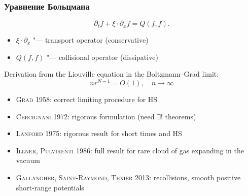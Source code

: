 \documentclass[mathserif]{beamer} %
\newcommand{\pder}[2][]{\partial_{#2}{#1}}
\newcommand{\OO}[1]{O(#1)}
\newcommand{\Cite}[2][]{\alert{\textsc{#2 #1}}}
\begin{document}
\begin{frame}
    \frametitle{Уравнение Больцмана}
    \begin{equation*}
        \pder[f]{t} + \xi\cdot\pder[f]{x} = Q(f,f).
    \end{equation*}

    \begin{itemize}
        \item \(\xi\cdot\pder{x}\) "--- transport operator (conservative)
        \item \(Q(f,f)\) "--- collisional operator (dissipative)
    \end{itemize}

    \pause
    Derivation from the Liouville equation in the Boltzmann--Grad limit: %
    \[ nr^{N-1}=\OO{1}, \quad n\to\infty\]\vspace{-20pt}
    \begin{itemize}
        \item \Cite[1958]{Grad}: correct limiting procedure for HS
        \item \Cite[1972]{Cercignani}: rigorous formulation (need \(\exists!\) theorems)
        \item \Cite[1975]{Lanford}: rigorous result for short times and HS
        \item \Cite[1986]{Illner, Pulvirenti}: full result for rare cloud of gas expanding in the vacuum
        \item \Cite[2013]{Gallangher, Saint-Raymond, Texier}: recollisions, smooth positive short-range potentials
    \end{itemize}
\end{frame}
\end{document}
